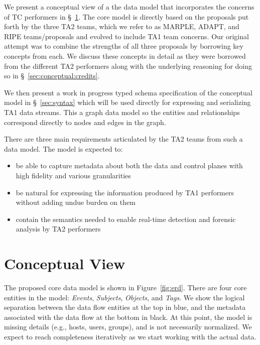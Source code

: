 \documentclass[10pt, conference, onecolumn]{IEEEtran}
\begin{document}
We present a conceptual view of a the data model that incorporates the concerns of TC performers in \S~\ref{sec:conceptual}.
The core model is directly based on the proposals put forth by the three TA2 teams, which we refer to as MARPLE, ADAPT, and RIPE teams/proposals
and evolved to include TA1 team concerns.
Our original attempt was to combine the strengths of all three proposals by borrowing key concepts from each.
We discuss these concepts in detail as they were borrowed from the different TA2 performers along with the underlying reasoning for doing so in \S~\ref{sec:conceptual:credits}.

We then present a work in progress typed schema specification of the conceptual model in \S~\ref{sec:syntax} which will be used directly for expressing and serializing TA1 data streams.
This a graph data model so the entities and relationships correspond directly to nodes and edges in the graph.

There are three main requirements articulated by the TA2 teams from such a data model. The model is expected to:
\begin{itemize}
\item be able to capture metadata about both the data and control planes with high fidelity and various granularities
\item be natural for expressing the information produced by TA1 performers without adding undue burden on them
\item contain the semantics needed to enable real-time detection and forensic analysis by TA2 performers
\end{itemize}

\section{Conceptual View}\label{sec:conceptual}
The proposed core data model is shown in Figure~\ref{fig:erd}. 
There are four core entities in the model: \textit{Events}, \textit{Subjects}, \textit{Objects}, and \textit{Tags}.
We show the logical separation between the data flow entities at the top in blue, and the metadata associated with the data flow at the bottom in black. At this point, the model is missing details (e.g., hosts, users, groups), and is not necessarily normalized. We expect to reach completeness iteratively as we start working with the actual data.
\end{document}
